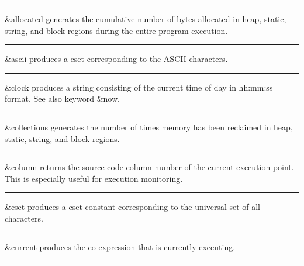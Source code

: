 \bigskip\hrule\vspace{0.1cm}

\noindent
{}\textsf{\&allocated} generates the cumulative number
of bytes allocated in heap, static, string, and block regions during
the entire program execution.

\bigskip\hrule\vspace{0.1cm}

\noindent
{}\textsf{\&ascii} produces a cset corresponding to
the ASCII characters.

\bigskip\hrule\vspace{0.1cm}

\noindent
\textsf{\&clock} produces a string consisting of the current time of day in hh:mm:ss format. See also keyword
\textsf{\&now}.

\bigskip\hrule\vspace{0.1cm}

\noindent
{}\textsf{\&collections} generates the number of
times memory has been reclaimed in heap, static, string, and block
regions.

\bigskip\hrule\vspace{0.1cm}

\noindent
\textsf{\&column} returns the source code
column number of the current execution point. This
is especially useful for execution monitoring.

\bigskip\hrule\vspace{0.1cm}

\noindent
{}\textsf{\&cset} produces a cset constant
corresponding to the universal set of all characters.

\bigskip\hrule\vspace{0.1cm}

\noindent
{}\textsf{\&current} produces the
co-expression that is currently executing.

\bigskip\hrule\vspace{0.1cm}

